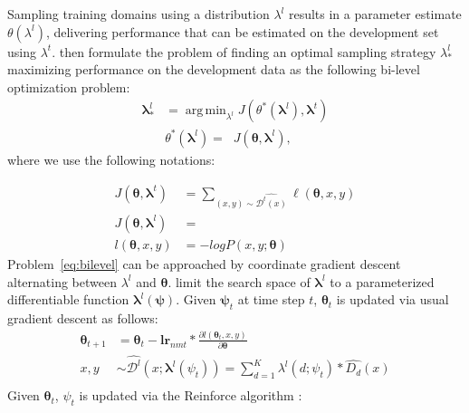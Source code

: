\documentclass[11pt,a4paper]{article}
\newcommand{\fyTodo}[1]{\Todo[FY:]{\textcolor{orange}{#1}}}
\newcommand{\vlambda}{\ensuremath{\boldsymbol\lambda}\xspace} %
\newcommand{\vtheta}{\ensuremath{\boldsymbol\theta}\xspace} %
\newcommand{\vpsi}{\ensuremath{\boldsymbol\psi}\xspace} %
\DeclareMathOperator*{\argmin}{arg\,min}
\begin{document}
Sampling training domains using a distribution $\lambda^{l}$ results in a parameter estimate $\theta(\lambda^{l})$, delivering performance that can be estimated on the development set using $\lambda^{t}$. \citet{Wang20optimizing,Wang20balancing} then formulate the problem of finding an optimal sampling strategy $\lambda^{l}_{*}$ maximizing performance on the development data as the following bi-level optimization problem:
\begin{equation} \label{eq:bilevel}
\begin{split}
\vlambda^{l}_* &= \displaystyle{\mathop{\argmin}_{\lambda^{l}} J(\theta^*(\vlambda^{l}), \vlambda^{t})} \\
					& \theta^*(\vlambda^{l}) = \displaystyle{\mathop{\argmin_{\vtheta}} J(\vtheta, \vlambda^{l})}, 
\end{split}
\end{equation}
where we use the following notations:%

\begin{align*}
J(\vtheta, \vlambda^{t} ) &= \displaystyle{\mathop{\sum}_{(x,y) \sim \widehat{\mathcal{D}^{t}(x)}} \ell(\vtheta,x,y)} \\
J(\vtheta, \vlambda^{l}) &= \displaystyle{\mathop{E_{(x,y) \sim \widehat{\mathcal{D}^{l}(x)}}[\ell(\vtheta,x,y)]}} \\
l(\vtheta,x,y) &= - log P(x,y;\vtheta)
\end{align*}
Problem~\eqref{eq:bilevel} can be approached by coordinate gradient descent alternating between $\lambda^{l}$ and $\vtheta$. \citet{Wang20balancing} limit the search space of $\vlambda^{l}$ to a parameterized differentiable function $\vlambda^{l}(\vpsi)$. Given $\vpsi_t$ at time step $t$, $\vtheta_t$ is updated via usual gradient descent as follows:
\begin{align*}
\vtheta_{t+1} &= \vtheta_t - \mathbf{lr}_{nmt} * \frac{\partial l(\vtheta_t, x,y)}{\partial \vtheta} \\
x,y &\sim \widehat{\mathcal{D}^l}(x;\vlambda^l(\psi_t)) = \displaystyle{\mathop{\sum}_{d=1}^K} \lambda^l(d;\psi_t) * \widehat{D_d}(x) \\
\end{align*}
Given $\vtheta_t$, $\psi_t$ is updated via the Reinforce algorithm \cite{Williams92reinforce}:\fyTodo{Rewrite this correctly with domain average reward}
\end{document}
